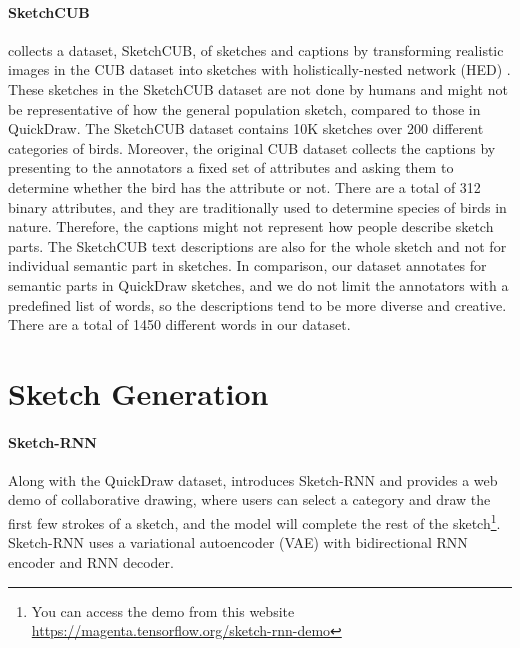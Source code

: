 \paragraph{SketchCUB}
\cite{sketchbirds} collects a dataset, SketchCUB, of sketches and captions by transforming realistic images in the CUB dataset \citep{WahCUB_200_2011} into sketches with holistically-nested network (HED) \citep{hedPaper}. These sketches in the SketchCUB dataset are not done by humans and might not be representative of how the general population sketch, compared to those in QuickDraw.
The SketchCUB dataset contains 10K sketches over 200 different categories of birds. Moreover, the original CUB dataset collects the captions by presenting to the annotators a fixed set of attributes and asking them to determine whether the bird has the attribute or not. There are a total of 312 binary attributes, and they are traditionally used to determine species of birds in nature. Therefore, the captions might not represent how people describe sketch parts. 
The SketchCUB text descriptions are also for the whole sketch and not for individual semantic part in sketches.
In comparison, our dataset annotates for semantic parts in QuickDraw sketches, and we do not limit the annotators with a predefined list of words, so the descriptions tend to be more diverse and creative. There are a total of 1450 different words in our dataset.            


\section{Sketch Generation} \label{related.sketch.generate}

\paragraph{Sketch-RNN}
Along with the QuickDraw dataset, \cite{ha2017neural} introduces Sketch-RNN and provides a web demo of collaborative drawing, where users can select a category and draw the first few strokes of a sketch, and the model will complete the rest of the sketch\footnote{You can access the demo from this website \url{https://magenta.tensorflow.org/sketch-rnn-demo}}. Sketch-RNN uses a variational autoencoder (VAE) with bidirectional RNN encoder and RNN decoder. 

